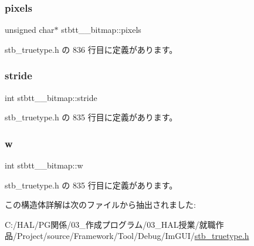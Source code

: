 \mbox{\label{structstbtt____bitmap_ae6be77625faf55b110eaaffde5c7733c}} 
\subsubsection{\texorpdfstring{pixels}{pixels}}
{\footnotesize\ttfamily unsigned char$\ast$ stbtt\+\_\+\+\_\+bitmap\+::pixels}



 stb\+\_\+truetype.\+h の 836 行目に定義があります。

\mbox{\label{structstbtt____bitmap_a48ee6b550ee4f1d85bfc32c62c0e9a98}} 
\subsubsection{\texorpdfstring{stride}{stride}}
{\footnotesize\ttfamily int stbtt\+\_\+\+\_\+bitmap\+::stride}



 stb\+\_\+truetype.\+h の 835 行目に定義があります。

\mbox{\label{structstbtt____bitmap_afbd607426f0a457b1a871ed902eeb926}} 
\subsubsection{\texorpdfstring{w}{w}}
{\footnotesize\ttfamily int stbtt\+\_\+\+\_\+bitmap\+::w}



 stb\+\_\+truetype.\+h の 835 行目に定義があります。



この構造体詳解は次のファイルから抽出されました\+:\begin{DoxyCompactItemize}
\item 
C\+:/\+H\+A\+L/\+P\+G関係/03\+\_\+作成プログラム/03\+\_\+\+H\+A\+L授業/就職作品/\+Project/source/\+Framework/\+Tool/\+Debug/\+Im\+G\+U\+I/\mbox{\hyperlink{stb__truetype_8h}{stb\+\_\+truetype.\+h}}\end{DoxyCompactItemize}
